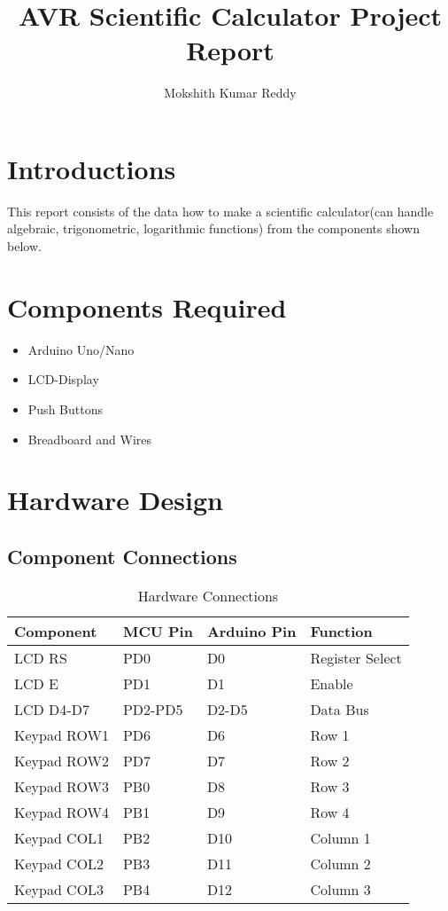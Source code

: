 \documentclass{article}
\title{AVR Scientific Calculator Project Report}
\author{Mokshith Kumar Reddy}
\begin{document}
{\let\newpage\relax\maketitle}

\renewcommand{\thefigure}{\theenumi}
\renewcommand{\thetable}{\theenumi}
\setlength{\intextsep}{10pt} %


\renewcommand{\thetable}{\theenumi}
\tableofcontents
\newpage

\section{Introductions}
This report consists of the data how to make a scientific calculator(can handle algebraic, trigonometric, logarithmic functions) from the components shown below.
\section{Components Required}
\begin{itemize}
\item Arduino Uno/Nano
\item LCD-Display
\item Push Buttons
\item Breadboard and Wires
\end{itemize}

\section{Hardware Design}

\subsection{Component Connections}

\begin{table}[H]
\centering
\caption{Hardware Connections}
\label{tab:connections}
\begin{tabular}{llll}
\toprule
\textbf{Component} & \textbf{MCU Pin} & \textbf{Arduino Pin} & \textbf{Function} \\
\midrule
LCD RS & PD0 & D0 & Register Select \\
LCD E & PD1 & D1 & Enable \\
LCD D4-D7 & PD2-PD5 & D2-D5 & Data Bus \\
Keypad ROW1 & PD6 & D6 & Row 1 \\
Keypad ROW2 & PD7 & D7 & Row 2 \\
Keypad ROW3 & PB0 & D8 & Row 3 \\
Keypad ROW4 & PB1 & D9 & Row 4 \\
Keypad COL1 & PB2 & D10 & Column 1 \\
Keypad COL2 & PB3 & D11 & Column 2 \\
Keypad COL3 & PB4 & D12 & Column 3 \\
\bottomrule
\end{tabular}
\end{table}
\end{document}
